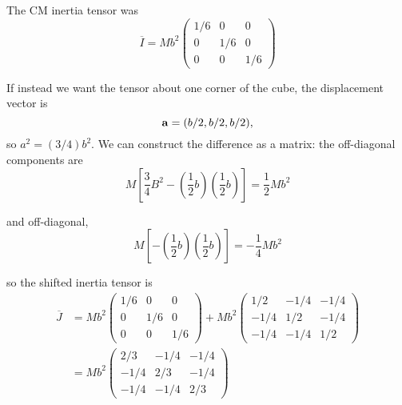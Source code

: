 \begin{exa}
The CM inertia tensor was
\[ \overline{I} = Mb^2 \left( \begin{array}{ccc} 1/6 & 0 & 0 \\ 0 & 1/6 & 0 \\ 0 & 0 & 1/6 \end{array} \right)\]

If instead we want the tensor about one corner of the cube, the displacement vector is 
\[\mathbf{ a} = (b/2, b/2, b/2),\]
so $a^2 = (3/4) b^2.$ We can construct the difference as a matrix: the off-diagonal components are
\[M \left[\dfrac{3}{4} B^2 - \left(\dfrac{1}{2} b\right)\left(\dfrac{1}{2} b\right) \right] = \dfrac{1}{2} M b^2\]

and off-diagonal,
\[M \left[-\left(\dfrac{1}{2} b\right)\left(\dfrac{1}{2} b\right) \right] = -\dfrac{1}{4} M b^2\]

so the shifted inertia tensor is
\begin{align}
 \overline{J} &= Mb^2 \left( \begin{array}{ccc} 1/6 & 0 & 0 \\ 0 & 1/6 & 0 \\ 0 & 0 & 1/6 \end{array} \right) + Mb^2 \left( \begin{array}{ccc} 1/2 & -1/4 & -1/4 \\ -1/4 & 1/2 & -1/4 \\ -1/4 & -1/4 & 1/2 \end{array} \right) \\  
&= Mb^2 \left( \begin{array}{ccc} 2/3 & -1/4 & -1/4 \\ -1/4 & 2/3 & -1/4 \\ -1/4 & -1/4 & 2/3 \end{array} \right)
\end{align}


\end{exa}




